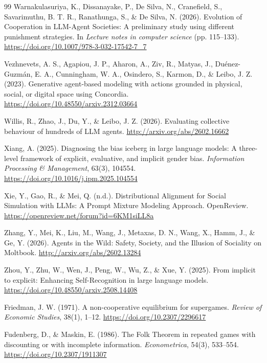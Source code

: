 \documentclass[12pt,letterpaper]{report}
\begin{document}
\begin{thebibliography}{99}
Warnakulasuriya, K., Dissanayake, P., De Silva, N., Cranefield, S., Savarimuthu, B. T. R., Ranathunga, S., \& De Silva, N. (2026). Evolution of Cooperation in LLM-Agent Societies: A preliminary study using different punishment strategies. In \textit{Lecture notes in computer science} (pp. 115--133). \url{https://doi.org/10.1007/978-3-032-17542-7_7}

Vezhnevets, A. S., Agapiou, J. P., Aharon, A., Ziv, R., Matyas, J., Du\'enez-Guzm\'an, E. A., Cunningham, W. A., Osindero, S., Karmon, D., \& Leibo, J. Z. (2023). Generative agent-based modeling with actions grounded in physical, social, or digital space using Concordia. \url{https://doi.org/10.48550/arxiv.2312.03664}

Willis, R., Zhao, J., Du, Y., \& Leibo, J. Z. (2026). Evaluating collective behaviour of hundreds of LLM agents. \url{http://arxiv.org/abs/2602.16662}

Xiang, A. (2025). Diagnosing the bias iceberg in large language models: A three-level framework of explicit, evaluative, and implicit gender bias. \textit{Information Processing \& Management}, 63(3), 104554. \url{https://doi.org/10.1016/j.ipm.2025.104554}

Xie, Y., Gao, R., \& Mei, Q. (n.d.). Distributional Alignment for Social Simulation with LLMs: A Prompt Mixture Modeling Approach. OpenReview. \url{https://openreview.net/forum?id=6KM1siLL8a}

Zhang, Y., Mei, K., Liu, M., Wang, J., Metaxas, D. N., Wang, X., Hamm, J., \& Ge, Y. (2026). Agents in the Wild: Safety, Society, and the Illusion of Sociality on Moltbook. \url{http://arxiv.org/abs/2602.13284}

Zhou, Y., Zhu, W., Wen, J., Peng, W., Wu, Z., \& Xue, Y. (2025). From implicit to explicit: Enhancing Self-Recognition in large language models. \url{https://doi.org/10.48550/arxiv.2508.14408}

Friedman, J. W. (1971). A non-cooperative equilibrium for supergames. \textit{Review of Economic Studies}, 38(1), 1--12. \url{https://doi.org/10.2307/2296617}

Fudenberg, D., \& Maskin, E. (1986). The Folk Theorem in repeated games with discounting or with incomplete information. \textit{Econometrica}, 54(3), 533--554. \url{https://doi.org/10.2307/1911307}


\end{thebibliography}
\end{document}
